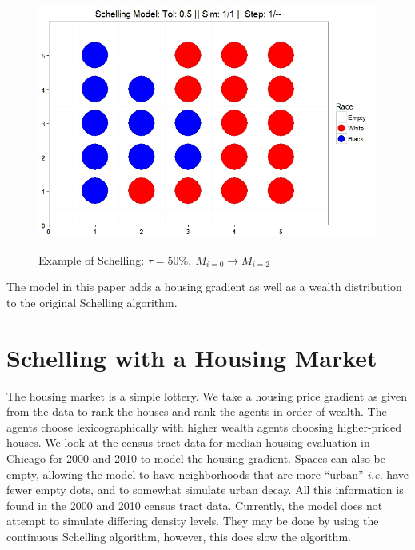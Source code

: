 {\begin{figure}[h!]
\begin{floatrow}
{}
{%
\includegraphics[scale=0.25]{figures/Ex2.jpeg}
}
\end{floatrow}
\caption[Example of Schelling Process]{Example of Schelling: $\tau = 50\%,\ M_{i=0} \rightarrow M_{i=2}$}
\end{figure}

The model in this paper adds a housing gradient as well as a wealth distribution to the original Schelling algorithm.

\section{Schelling with a Housing Market}

The housing market is a simple lottery. We take a housing price gradient as given from the data to rank the houses and rank the agents in order of wealth. The agents choose lexicographically with higher wealth agents choosing higher-priced houses. We look at the census tract data for median housing evaluation in Chicago for 2000 and 2010 to model the housing gradient. Spaces can also be empty, allowing the model to have neighborhoods that are more ``urban'' \textit{i.e.} have fewer empty dots, and to somewhat simulate urban decay. All this information is found in the 2000 and 2010 census tract data. Currently, the model does not attempt to simulate differing density levels. They may be done by using the continuous Schelling algorithm, however, this does slow the algorithm.

}
